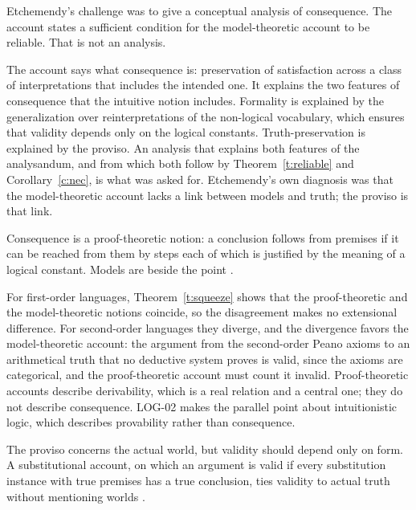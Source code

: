 \documentclass{situationist-preprint}
\begin{document}
\begin{objection}[Analysis]
Etchemendy's challenge was to give a conceptual analysis of consequence. The account states a sufficient condition for the model-theoretic account to be reliable. That is not an analysis.
\end{objection}

\begin{reply}
The account says what consequence is: preservation of satisfaction across a class of interpretations that includes the intended one. It explains the two features of consequence that the intuitive notion includes. Formality is explained by the generalization over reinterpretations of the non-logical vocabulary, which ensures that validity depends only on the logical constants. Truth-preservation is explained by the proviso. An analysis that explains both features of the analysandum, and from which both follow by Theorem~\ref{t:reliable} and Corollary~\ref{c:nec}, is what was asked for. Etchemendy's own diagnosis was that the model-theoretic account lacks a link between models and truth; the proviso is that link.
\end{reply}

\begin{objection}
Consequence is a proof-theoretic notion: a conclusion follows from premises if it can be reached from them by steps each of which is justified by the meaning of a logical constant. Models are beside the point \citep{Prawitz1985}.
\end{objection}

\begin{reply}
For first-order languages, Theorem~\ref{t:squeeze} shows that the proof-theoretic and the model-theoretic notions coincide, so the disagreement makes no extensional difference. For second-order languages they diverge, and the divergence favors the model-theoretic account: the argument from the second-order Peano axioms to an arithmetical truth that no deductive system proves is valid, since the axioms are categorical, and the proof-theoretic account must count it invalid. Proof-theoretic accounts describe derivability, which is a real relation and a central one; they do not describe consequence. LOG-02 makes the parallel point about intuitionistic logic, which describes provability rather than consequence.
\end{reply}

\begin{objection}[Substitution]
The proviso concerns the actual world, but validity should depend only on form. A substitutional account, on which an argument is valid if every substitution instance with true premises has a true conclusion, ties validity to actual truth without mentioning worlds \citep{Halbach2020}.
\end{objection}
\end{document}
